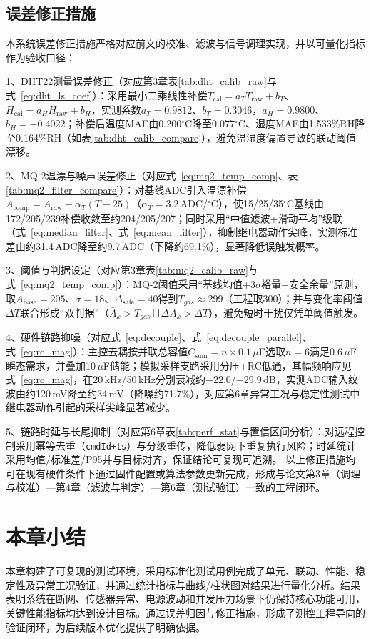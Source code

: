 \documentclass[UTF8,12pt,a4paper,oneside]{ctexbook}
\newcommand{\kuan}[1]{\par\noindent\CJKfamily{song}\zihao{-4}#1、}
\numberwithin{equation}{chapter}
\begin{document}
\subsection{误差修正措施}
本系统误差修正措施严格对应前文的校准、滤波与信号调理实现，并以可量化指标作为验收口径：  
\kuan{1}DHT22测量误差修正（对应第3章表\ref{tab:dht_calib_raw}与式~\eqref{eq:dht_ls_coef}）：采用最小二乘线性补偿$T_{\mathrm{cal}}=a_TT_{\mathrm{raw}}+b_T$、$H_{\mathrm{cal}}=a_HH_{\mathrm{raw}}+b_H$，实测系数$a_T=0.9812$、$b_T=0.3046$，$a_H=0.9800$、$b_H=-0.4022$；补偿后温度MAE由0.200$^\circ$C降至0.077$^\circ$C、湿度MAE由1.533\%RH降至0.164\%RH（如表\ref{tab:dht_calib_compare}），避免温湿度偏置导致的联动阈值漂移。  
\kuan{2}MQ-2温漂与噪声误差修正（对应式~\eqref{eq:mq2_temp_comp}、表\ref{tab:mq2_filter_compare}）：对基线ADC引入温漂补偿$A_{\mathrm{comp}}=A_{\mathrm{raw}}-\alpha_T(T-25)$（$\alpha_T=3.2$\,ADC/$^\circ$C），使15/25/35$^\circ$C基线由172/205/239补偿收敛至约204/205/207；同时采用“中值滤波+滑动平均”级联（式~\eqref{eq:median_filter}、式~\eqref{eq:mean_filter}），抑制继电器动作尖峰，实测标准差由约31.4\,ADC降至约9.7\,ADC（下降约69.1\%），显著降低误触发概率。  
\kuan{3}阈值与判据设定（对应第3章表\ref{tab:mq2_calib_raw}与式~\eqref{eq:mq2_temp_comp}）：MQ-2阈值采用“基线均值+3$\sigma$裕量+安全余量”原则，取$A_{\mathrm{base}}=205$、$\sigma=18$、$\Delta_{\mathrm{safe}}=40$得到$T_{gas}\approx299$（工程取300）；并与变化率阈值$\Delta T$联合形成“双判据”（$\bar{A}_k>T_{gas}$且$\Delta A_k>\Delta T$），避免短时干扰仅凭单阈值触发。  
\kuan{4}硬件链路抑噪（对应式~\eqref{eq:decouple}、式~\eqref{eq:decouple_parallel}、式~\eqref{eq:rc_mag}）：主控去耦按并联总容值$C_{\mathrm{sum}}=n\times0.1\,\mu$F选取$n=6$满足0.6\,$\mu$F瞬态需求，并叠加10\,$\mu$F储能；模拟采样支路采用分压+RC低通，其幅频响应见式~\eqref{eq:rc_mag}，在20\,kHz/50\,kHz分别衰减约$-22.0$/$-29.9$\,dB，实测ADC输入纹波由约120\,mV降至约34\,mV（降噪约71.7\%），对应第6章异常工况与稳定性测试中继电器动作引起的采样尖峰显著减少。  
\kuan{5}链路时延与长尾抑制（对应第6章表\ref{tab:perf_stat}与置信区间分析）：对远程控制采用幂等去重（\texttt{cmdId+ts}）与分级重传，降低弱网下重复执行风险；时延统计采用均值/标准差/P95并与目标对齐，保证结论可复现可追溯。  
以上修正措施均可在现有硬件条件下通过固件配置或算法参数更新完成，形成与论文第3章（调理与校准）—第4章（滤波与判定）—第6章（测试验证）一致的工程闭环。

\section{本章小结}
本章构建了可复现的测试环境，采用标准化测试用例完成了单元、联动、性能、稳定性及异常工况验证，并通过统计指标与曲线/柱状图对结果进行量化分析。结果表明系统在断网、传感器异常、电源波动和并发压力场景下仍保持核心功能可用，关键性能指标均达到设计目标。通过误差归因与修正措施，形成了测控工程导向的验证闭环，为后续版本优化提供了明确依据。
\end{document}
